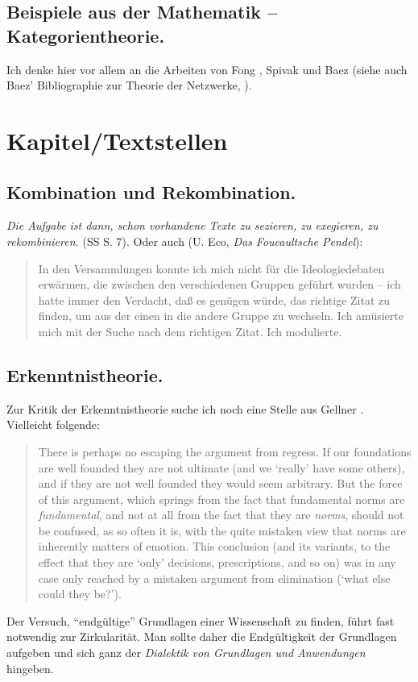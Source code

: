 \documentclass[a4paper, 10pt]{amsart}
\begin{document}
\subsection{Beispiele aus der Mathematik -- Kategorientheorie.}
Ich denke hier vor allem an die Arbeiten von Fong \cite{fongCategoricalApproachOpen2016,fongAlgebraOpenInterconnected2016,fongBehavioralMereology2018}, Spivak \cite{spivakOperadWiringDiagrams2013} und Baez \cite{baezCategoriesControl2014} (siehe auch Baez' Bibliographie zur Theorie der Netzwerke, \cite{NetworkTheoryBaez}).
\section{Kapitel/Textstellen}
\subsection{Kombination und Rekombination.}
\emph{Die Aufgabe ist dann, schon vorhandene Texte zu sezieren, zu exegieren, zu rekombinieren.} (SS S. 7). Oder auch (U. Eco, \emph{Das Foucaultsche Pendel}):
\begin{quotation}
In den Versammlungen konnte ich mich nicht f\"ur die Ideologiedebaten erw\"armen, die zwischen den verschiedenen Gruppen gef\"uhrt wurden -- ich hatte immer den Verdacht, da{\ss} es gen\"ugen w\"urde, das richtige Zitat zu finden, um aus der einen in die andere Gruppe zu wechseln. Ich am\"usierte mich mit der Suche nach dem richtigen Zitat. Ich modulierte.
\end{quotation}
\subsection{Erkenntnistheorie.}
Zur Kritik der Erkenntnistheorie suche ich noch eine Stelle aus Gellner \cite{gellner1979legitimation}. Vielleicht folgende:
%
\begin{quotation}
There is perhaps no escaping the argument from regress. If our foundations are well founded they are not ultimate (and we `really' have some others), and if they are not well founded they would seem arbitrary. But the force of this argument, which springs from the fact that fundamental norms are \emph{fundamental}, and not at all from the fact that they are \emph{norms}, should not be confused, as so often it is, with the quite mistaken view that norms are inherently matters of emotion. This conclusion (and its variants, to the effect that they are `only' decisions, prescriptions, and so on) was in any case only reached by a mistaken argument from elimination (`what else could they be?').
\end{quotation}
%
Der Versuch, ``endgültige'' Grundlagen einer Wissenschaft zu finden, führt fast notwendig zur Zirkularität. Man sollte daher die Endgültigkeit der Grundlagen aufgeben und sich ganz der \emph{Dialektik von Grundlagen und Anwendungen} hingeben.
\end{document}
